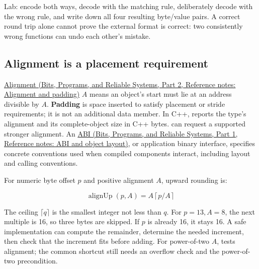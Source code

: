 Lab: encode  both ways, decode with the matching rule, deliberately decode with the wrong rule, and write down all four resulting byte/value pairs. A correct round trip alone cannot prove the external format is correct: two consistently wrong functions can undo each other's mistake.

\subsection{Alignment is a placement requirement}\label{05-engine-i-ch002-alignment-is-a-placement-requirement}

\hypertarget{05-engine-i-ch002-alignment-is-a-placement-requirement}{}

\href{../01-Bits-Programs-and-Reliable-Systems-P02/main.pdf\#appendix-a1f7c53b4742}{Alignment (Bits, Programs, and Reliable Systems, Part 2, Reference notes: Alignment and padding)} \(A\) means an object's start must lie at an address divisible by \(A\). \textbf{Padding} is space inserted to satisfy placement or stride requirements; it is not an additional data member. In C++,  reports the type's alignment and  its complete-object size in C++ bytes.  can request a supported stronger alignment. An \href{../01-Bits-Programs-and-Reliable-Systems-P01/main.pdf\#appendix-c4ac6bb0fff8}{ABI (Bits, Programs, and Reliable Systems, Part 1, Reference notes: ABI and object layout)}, or application binary interface, specifies concrete conventions used when compiled components interact, including layout and calling conventions.

For numeric byte offset \(p\) and positive alignment \(A\), upward rounding is:

\[
\operatorname{alignUp}(p,A)=A\left\lceil p/A\right\rceil
\]

The ceiling \(\lceil q\rceil\) is the smallest integer not less than \(q\). For \(p=13,A=8\), the next multiple is 16, so three bytes are skipped. If \(p\) is already 16, it stays 16. A safe implementation can compute the remainder, determine the needed increment, then check that the increment fits before adding. For power-of-two \(A\),  tests alignment; the common  shortcut still needs an overflow check and the power-of-two precondition.

